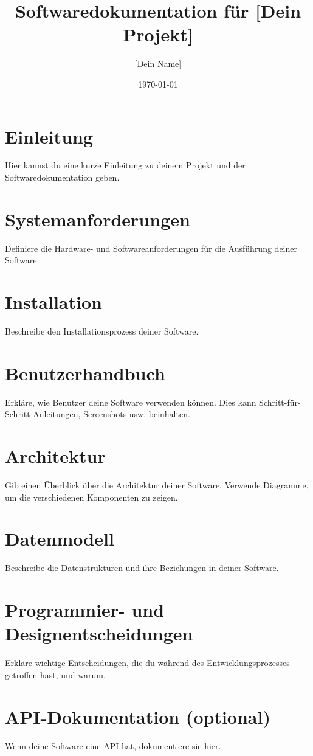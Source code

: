 \documentclass[a4paper, 12pt]{article}
\title{Softwaredokumentation für [Dein Projekt]}
\author{[Dein Name]}
\date{\today}
\begin{document}
    \maketitle
    \tableofcontents
    \newpage

    \section{Einleitung}
    Hier kannst du eine kurze Einleitung zu deinem Projekt und der Softwaredokumentation geben.

    \section{Systemanforderungen}
    Definiere die Hardware- und Softwareanforderungen für die Ausführung deiner Software.

    \section{Installation}
    Beschreibe den Installationsprozess deiner Software.

    \section{Benutzerhandbuch}
    Erkläre, wie Benutzer deine Software verwenden können. Dies kann Schritt-für-Schritt-Anleitungen, Screenshots usw. beinhalten.

    \section{Architektur}
    Gib einen Überblick über die Architektur deiner Software. Verwende Diagramme, um die verschiedenen Komponenten zu zeigen.

    \section{Datenmodell}
    Beschreibe die Datenstrukturen und ihre Beziehungen in deiner Software.

    \section{Programmier- und Designentscheidungen}
    Erkläre wichtige Entscheidungen, die du während des Entwicklungsprozesses getroffen hast, und warum.

    \section{API-Dokumentation (optional)}
    Wenn deine Software eine API hat, dokumentiere sie hier.
\end{document}
